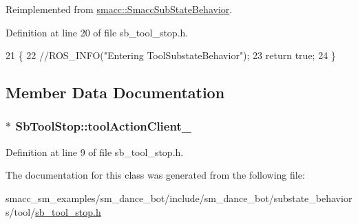 Reimplemented from \hyperlink{classsmacc_1_1SmaccSubStateBehavior_ab78b9de76c04a7ab6c16d5924e216ef9}{smacc\+::\+Smacc\+Sub\+State\+Behavior}.



Definition at line 20 of file sb\+\_\+tool\+\_\+stop.\+h.


\begin{DoxyCode}
21     \{
22       \textcolor{comment}{//ROS\_INFO("Entering ToolSubstateBehavior");}
23       \textcolor{keywordflow}{return} \textcolor{keyword}{true};
24     \}
\end{DoxyCode}


\subsection{Member Data Documentation}
\subsubsection[{\texorpdfstring{tool\+Action\+Client\+\_\+}{toolActionClient_}}]{$\ast$ Sb\+Tool\+Stop\+::tool\+Action\+Client\+\_\+}\hypertarget{classSbToolStop_ad1d7100ab912d6671d09e1ae8e038086}{}\label{classSbToolStop_ad1d7100ab912d6671d09e1ae8e038086}


Definition at line 9 of file sb\+\_\+tool\+\_\+stop.\+h.



The documentation for this class was generated from the following file\+:\begin{DoxyCompactItemize}
\item 
smacc\+\_\+sm\+\_\+examples/sm\+\_\+dance\+\_\+bot/include/sm\+\_\+dance\+\_\+bot/substate\+\_\+behaviors/tool/\hyperlink{sb__tool__stop_8h}{sb\+\_\+tool\+\_\+stop.\+h}\end{DoxyCompactItemize}

